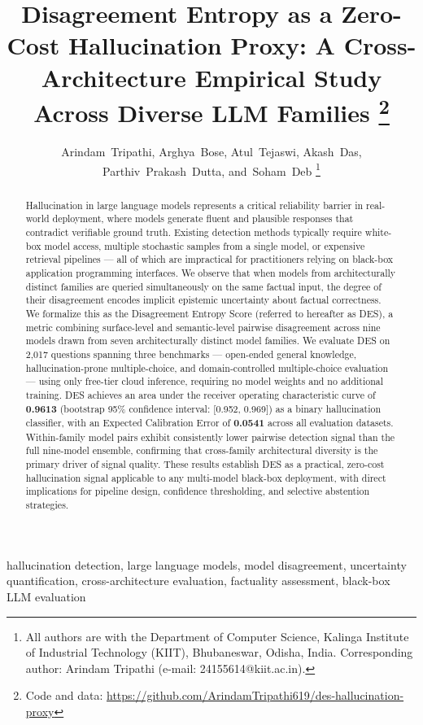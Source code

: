 \documentclass[journal]{IEEEtran}
\title{Disagreement Entropy as a Zero-Cost Hallucination Proxy:
A Cross-Architecture Empirical Study Across Diverse LLM Families%
\thanks{Code and data: \url{https://github.com/ArindamTripathi619/des-hallucination-proxy}}}
\author{Arindam~Tripathi,
        Arghya~Bose,
        Atul~Tejaswi,
        Akash~Das,
        Parthiv~Prakash~Dutta,
        and~Soham~Deb%
\thanks{All authors are with the Department of Computer Science,
Kalinga Institute of Industrial Technology (KIIT), Bhubaneswar,
Odisha, India. Corresponding author: Arindam Tripathi
(e-mail: 24155614@kiit.ac.in).}}
\begin{document}
\maketitle

\begin{abstract}
  Hallucination in large language models represents a critical reliability
  barrier in real-world deployment, where models generate fluent and
  plausible responses that contradict verifiable ground truth.
  Existing detection methods typically require white-box model access,
  multiple stochastic samples from a single model, or expensive retrieval
  pipelines --- all of which are impractical for practitioners relying on
  black-box application programming interfaces.
  We observe that when models from architecturally distinct families are
  queried simultaneously on the same factual input, the degree of their
  disagreement encodes implicit epistemic uncertainty about factual
  correctness.
  We formalize this as the Disagreement Entropy Score (referred to hereafter
  as DES), a metric combining surface-level and semantic-level pairwise
  disagreement across nine models drawn from seven architecturally distinct
  model families.
  We evaluate DES on 2,017 questions spanning three benchmarks
  --- open-ended general knowledge, hallucination-prone multiple-choice, and
  domain-controlled multiple-choice evaluation --- using only free-tier cloud
  inference, requiring no model weights and no additional training.
  DES achieves an area under the receiver operating characteristic curve of
  \textbf{0.9613} (bootstrap 95\% confidence interval: [0.952, 0.969]) as a
  binary hallucination classifier, with an Expected Calibration Error of
  \textbf{0.0541} across all evaluation datasets.
  Within-family model pairs exhibit consistently lower pairwise detection
  signal than the full nine-model ensemble, confirming that
  cross-family architectural diversity is the primary driver of signal quality.
  These results establish DES as a practical, zero-cost hallucination signal
  applicable to any multi-model black-box deployment, with direct
  implications for pipeline design, confidence thresholding, and
  selective abstention strategies.
\end{abstract}

\begin{IEEEkeywords}
hallucination detection, large language models, model disagreement,
uncertainty quantification, cross-architecture evaluation,
factuality assessment, black-box LLM evaluation
\end{IEEEkeywords}
\end{document}
